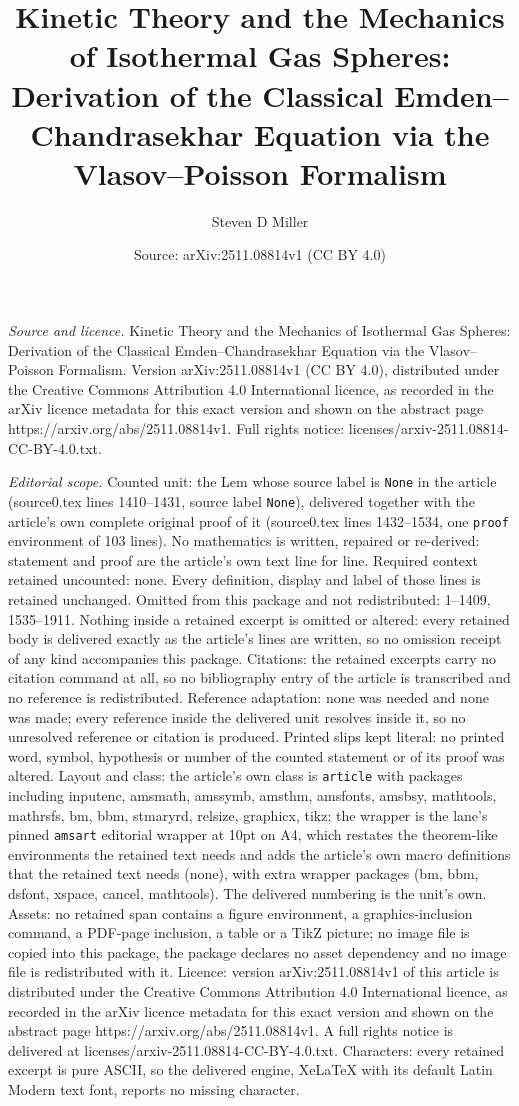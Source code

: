 \documentclass[10pt,a4paper]{amsart}
\title[Kinetic Theory and the Mechanics of Isothermal Gas Spheres: ]{Kinetic Theory and the Mechanics of Isothermal Gas Spheres: Derivation of the Classical Emden--Chandrasekhar Equation via the Vlasov--Poisson Formalism}
\author{Steven D Miller}
\date{Source: arXiv:2511.08814v1 (CC BY 4.0)}
\begin{document}
\maketitle

\noindent\emph{Source and licence.} Kinetic Theory and the Mechanics of Isothermal Gas Spheres: Derivation of the Classical Emden--Chandrasekhar Equation via the Vlasov--Poisson Formalism. Version arXiv:2511.08814v1 (CC BY 4.0), distributed under the Creative Commons Attribution 4.0 International licence, as recorded in the arXiv licence metadata for this exact version and shown on the abstract page https://arxiv.org/abs/2511.08814v1. Full rights notice: licenses/arxiv-2511.08814-CC-BY-4.0.txt.\par\smallskip

\noindent\textit{Editorial scope.} Counted unit: the Lem whose source label is \texttt{None} in the article (source0.tex lines 1410--1431, source label \texttt{None}), delivered together with the article's own complete original proof of it (source0.tex lines 1432--1534, one \texttt{proof} environment of 103 lines). No mathematics is written, repaired or re-derived: statement and proof are the article's own text line for line. Required context retained uncounted: none. Every definition, display and label of those lines is retained unchanged. Omitted from this package and not redistributed: 1--1409, 1535--1911. Nothing inside a retained excerpt is omitted or altered: every retained body is delivered exactly as the article's lines are written, so no omission receipt of any kind accompanies this package. Citations: the retained excerpts carry no citation command at all, so no bibliography entry of the article is transcribed and no reference is redistributed. Reference adaptation: none was needed and none was made; every reference inside the delivered unit resolves inside it, so no unresolved reference or citation is produced. Printed slips kept literal: no printed word, symbol, hypothesis or number of the counted statement or of its proof was altered. Layout and class: the article's own class is \texttt{article} with packages including inputenc, amsmath, amssymb, amsthm, amsfonts, amsbsy, mathtools, mathrsfs, bm, bbm, stmaryrd, relsize, graphicx, tikz; the wrapper is the lane's pinned \texttt{amsart} editorial wrapper at 10pt on A4, which restates the theorem-like environments the retained text needs and adds the article's own macro definitions that the retained text needs (none), with extra wrapper packages (bm, bbm, dsfont, xspace, cancel, mathtools). The delivered numbering is the unit's own. Assets: no retained span contains a figure environment, a graphics-inclusion command, a PDF-page inclusion, a table or a TikZ picture; no image file is copied into this package, the package declares no asset dependency and no image file is redistributed with it. Licence: version arXiv:2511.08814v1 of this article is distributed under the Creative Commons Attribution 4.0 International licence, as recorded in the arXiv licence metadata for this exact version and shown on the abstract page https://arxiv.org/abs/2511.08814v1. A full rights notice is delivered at licenses/arxiv-2511.08814-CC-BY-4.0.txt. Characters: every retained excerpt is pure ASCII, so the delivered engine, XeLaTeX with its default Latin Modern text font, reports no missing character.
\end{document}
